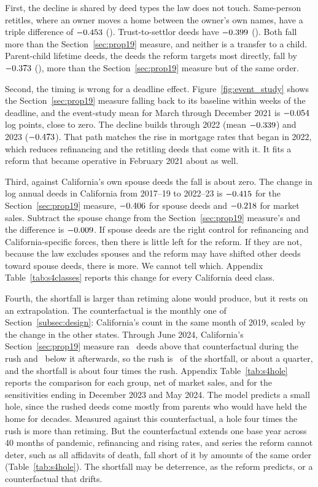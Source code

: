 First, the decline is shared by deed types the law does not touch. Same-person retitles, where an owner moves a home between the owner's own names, have a triple difference of $-0.453$ (\SIVRetitleDDDSE). Trust-to-settlor deeds have $-0.399$ (\SIVSettlorDDDSE). Both fall more than the Section~\ref{sec:prop19} measure, and neither is a transfer to a child. Parent-child lifetime deeds, the deeds the reform targets most directly, fall by $-0.373$ (\SIVPcDDDSE), more than the Section~\ref{sec:prop19} measure but of the same order.

Second, the timing is wrong for a deadline effect. Figure~\ref{fig:event_study} shows the Section~\ref{sec:prop19} measure falling back to its baseline within weeks of the deadline, and the event-study mean for March through December 2021 is $-0.054$ log points, close to zero. The decline builds through 2022 (mean $-0.339$) and 2023 ($-0.473$). That path matches the rise in mortgage rates that began in 2022, which reduces refinancing and the retitling deeds that come with it. It fits a reform that became operative in February 2021 about as well.

Third, against California's own spouse deeds the fall is about zero. The change in log annual deeds in California from 2017--19 to 2022--23 is $-0.415$ for the Section~\ref{sec:prop19} measure, $-0.406$ for spouse deeds and $-0.218$ for market sales. Subtract the spouse change from the Section~\ref{sec:prop19} measure's and the difference is $-0.009$. If spouse deeds are the right control for refinancing and California-specific forces, then there is little left for the reform. If they are not, because the law excludes spouses and the reform may have shifted other deeds toward spouse deeds, there is more. We cannot tell which. Appendix Table~\ref{tab:s4classes} reports this change for every California deed class.

Fourth, the shortfall is larger than retiming alone would produce, but it rests on an extrapolation. The counterfactual is the monthly one of Section~\ref{subsec:design}: California's count in the same month of 2019, scaled by the change in the other states. Through June 2024, California's Section~\ref{sec:prop19} measure ran \SIVMainRush\ deeds above that counterfactual during the rush and \SIVMainShortfall\ below it afterwards, so the rush is \SIVMainRushShortfall\ of the shortfall, or about a quarter, and the shortfall is about four times the rush. Appendix Table~\ref{tab:s4hole} reports the comparison for each group, net of market sales, and for the sensitivities ending in December 2023 and May 2024. The model predicts a small hole, since the rushed deeds come mostly from parents who would have held the home for decades. Measured against this counterfactual, a hole four times the rush is more than retiming. But the counterfactual extends one base year across 40 months of pandemic, refinancing and rising rates, and series the reform cannot deter, such as all affidavits of death, fall short of it by amounts of the same order (Table~\ref{tab:s4hole}). The shortfall may be deterrence, as the reform predicts, or a counterfactual that drifts.

